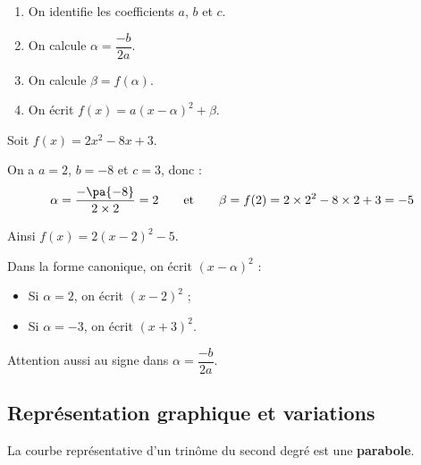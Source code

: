 \begin{methode}
	\nline
	\begin{enumerate}
		\item On identifie les coefficients $a$, $b$ et $c$.
		\item On calcule $\alpha = \dfrac{-b}{2a}$.
		\item On calcule $\beta = f(\alpha)$.
		\item On écrit $f(x) = a(x-\alpha)^2 + \beta$.
	\end{enumerate}
\end{methode}

\begin{ex}
	Soit $f(x) = 2x^2 - 8x + 3$.

	On a $a = 2$, $b = -8$ et $c = 3$, donc :
	\[
		\alpha = \frac{-\pa{-8}}{2 \times 2} = 2
		\qquad \text{et} \qquad
		\beta = f(2) = 2 \times 2^2 - 8 \times 2 + 3 = -5
	\]

	Ainsi $f(x) = 2(x-2)^2 - 5$.
\end{ex}

\begin{erreur}
	Dans la forme canonique, on écrit $(x - \alpha)^2$ :

	\begin{itemize}
		\item Si $\alpha = 2$, on écrit $(x-2)^2$ ;
		\item Si $\alpha = -3$, on écrit $(x+3)^2$.
	\end{itemize}

	Attention aussi au signe dans $\alpha = \dfrac{-b}{2a}$.
\end{erreur}

\subsection{Représentation graphique et variations}

La courbe représentative d'un trinôme du second degré est une \textbf{parabole}.

